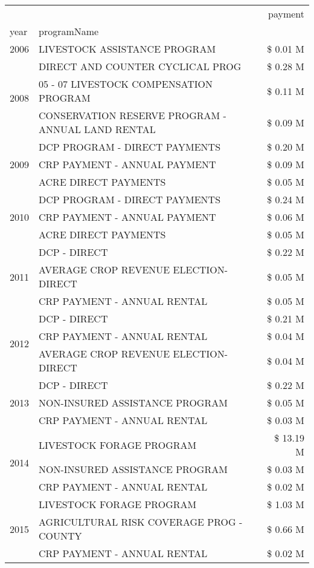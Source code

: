 \begin{tabular}{llr}
\toprule
 &  & payment \\
year & programName &  \\
\midrule
2006 & LIVESTOCK ASSISTANCE PROGRAM & \$ 0.01 M \\
\cline{1-3}
\multirow[t]{3}{*}{2008} & DIRECT AND COUNTER CYCLICAL PROG & \$ 0.28 M \\
 & 05 - 07 LIVESTOCK COMPENSATION PROGRAM & \$ 0.11 M \\
 & CONSERVATION RESERVE PROGRAM - ANNUAL LAND RENTAL & \$ 0.09 M \\
\cline{1-3}
\multirow[t]{3}{*}{2009} & DCP PROGRAM - DIRECT PAYMENTS & \$ 0.20 M \\
 & CRP PAYMENT - ANNUAL PAYMENT & \$ 0.09 M \\
 & ACRE DIRECT PAYMENTS & \$ 0.05 M \\
\cline{1-3}
\multirow[t]{3}{*}{2010} & DCP PROGRAM - DIRECT PAYMENTS & \$ 0.24 M \\
 & CRP PAYMENT - ANNUAL PAYMENT & \$ 0.06 M \\
 & ACRE DIRECT PAYMENTS & \$ 0.05 M \\
\cline{1-3}
\multirow[t]{3}{*}{2011} & DCP - DIRECT & \$ 0.22 M \\
 & AVERAGE CROP REVENUE ELECTION-DIRECT & \$ 0.05 M \\
 & CRP PAYMENT - ANNUAL RENTAL & \$ 0.05 M \\
\cline{1-3}
\multirow[t]{3}{*}{2012} & DCP - DIRECT & \$ 0.21 M \\
 & CRP PAYMENT - ANNUAL RENTAL & \$ 0.04 M \\
 & AVERAGE CROP REVENUE ELECTION-DIRECT & \$ 0.04 M \\
\cline{1-3}
\multirow[t]{3}{*}{2013} & DCP - DIRECT & \$ 0.22 M \\
 & NON-INSURED ASSISTANCE PROGRAM & \$ 0.05 M \\
 & CRP PAYMENT - ANNUAL RENTAL & \$ 0.03 M \\
\cline{1-3}
\multirow[t]{3}{*}{2014} & LIVESTOCK FORAGE PROGRAM & \$ 13.19 M \\
 & NON-INSURED ASSISTANCE PROGRAM & \$ 0.03 M \\
 & CRP PAYMENT - ANNUAL RENTAL & \$ 0.02 M \\
\cline{1-3}
\multirow[t]{3}{*}{2015} & LIVESTOCK FORAGE PROGRAM & \$ 1.03 M \\
 & AGRICULTURAL RISK COVERAGE PROG - COUNTY & \$ 0.66 M \\
 & CRP PAYMENT - ANNUAL RENTAL & \$ 0.02 M \\

\end{tabular}
